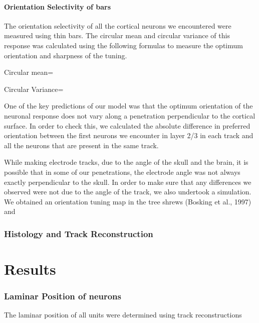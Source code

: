 \paragraph{Orientation Selectivity of bars}

The orientation selectivity of all the cortical neurons we encountered were measured using thin bars. The circular mean and circular variance of this response was calculated using the following formulas to measure the optimum orientation and sharpness of the tuning.

Circular mean=

Circular Variance=

One of the key predictions of our model was that the optimum orientation of the neuronal response does not vary along a penetration perpendicular to the cortical surface. In order to check this, we calculated the absolute difference in preferred orientation between the first neurons we encounter in layer 2/3 in each track and all the neurons that are present in the same track.

While making electrode tracks, due to the angle of the skull and the brain, it is possible that in some of our penetrations, the electrode angle was not always exactly perpendicular to the skull. In order to make sure that any differences we observed were not due to the angle of the track, we also undertook a simulation. We obtained an orientation tuning map in the tree shrews (Bosking et al., 1997) and 
\subsubsection{Histology and Track Reconstruction}


\section{Results}

\subsubsection{Laminar Position of neurons}

The laminar position of all units were determined using track reconstructions  

